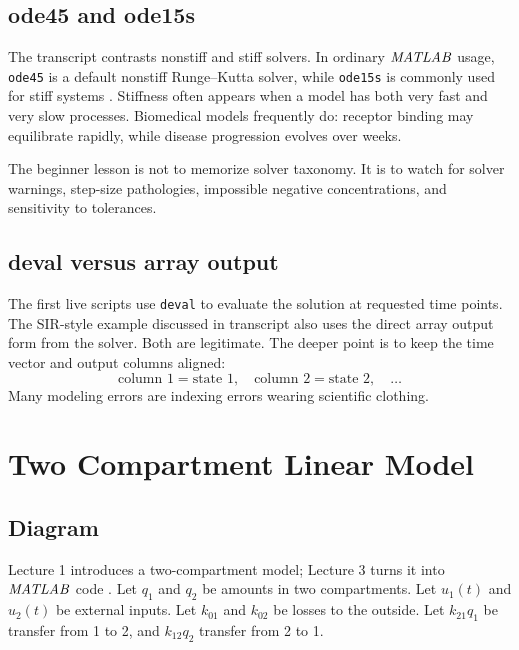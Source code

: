 \documentclass[a4paper]{article}
\newcommand{\MATLAB}{\ensuremath{\pksym{MATLAB}}}
\newcommand{\qone}{q_1}
\newcommand{\qtwo}{q_2}
\newcommand{\code}[1]{\texttt{#1}}
\begin{document}
\subsection{ode45 and ode15s}

The transcript contrasts nonstiff and stiff solvers. In ordinary \MATLAB{} usage, \code{ode45} is a default nonstiff Runge--Kutta solver, while \code{ode15s} is commonly used for stiff systems \cite{bmeg671TranscriptAug292025,bmeg671TranscriptSep032025}. Stiffness often appears when a model has both very fast and very slow processes. Biomedical models frequently do: receptor binding may equilibrate rapidly, while disease progression evolves over weeks.

The beginner lesson is not to memorize solver taxonomy. It is to watch for solver warnings, step-size pathologies, impossible negative concentrations, and sensitivity to tolerances.

\subsection{deval versus array output}

The first live scripts use \code{deval} to evaluate the solution at requested time points. The SIR-style example discussed in transcript also uses the direct array output form from the solver. Both are legitimate. The deeper point is to keep the time vector and output columns aligned:
\[
  \text{column 1}=\text{state 1},\quad
  \text{column 2}=\text{state 2},\quad
  \ldots
\]
Many modeling errors are indexing errors wearing scientific clothing.

\section{Two Compartment Linear Model}

\subsection{Diagram}

Lecture 1 introduces a two-compartment model; Lecture 3 turns it into \MATLAB{} code \cite{bmeg671Lecture1Slides2025,bmeg671Lecture2Slides2025,bmeg671MatlabTwoCompartment2025}. Let \(\qone\) and \(\qtwo\) be amounts in two compartments. Let \(u_1(t)\) and \(u_2(t)\) be external inputs. Let \(k_{01}\) and \(k_{02}\) be losses to the outside. Let \(k_{21}\qone\) be transfer from 1 to 2, and \(k_{12}\qtwo\) transfer from 2 to 1.
\end{document}
